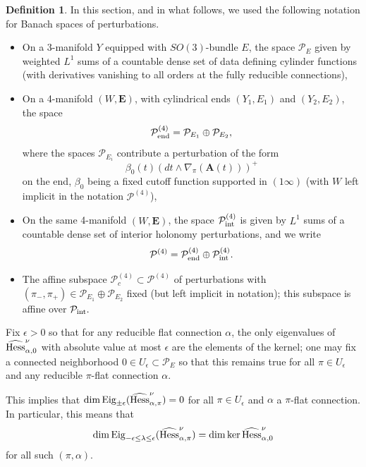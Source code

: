 \documentclass{memo-l}
\theoremstyle{definition}
\newtheorem{definition}[theorem]{Definition}
\theoremstyle{remark}
\numberwithin{section}{chapter}
\numberwithin{equation}{chapter}
\begin{document}
\begin{definition}\label{pertdef}In this section, and in what follows, we used the following notation for Banach spaces of perturbations. \begin{itemize}
\item On a 3-manifold $Y$ equipped with $SO(3)$-bundle $E$, the space $\mathcal P_E$ given by weighted $L^1$ sums of a countable dense set of data defining cylinder functions (with derivatives vanishing to all orders at the fully reducible connections), \\
\item On a 4-manifold $(W,\mathbf{E})$, with cylindrical ends $(Y_1, E_1)$ and $(Y_2, E_2)$, the space $$\mathcal P^{(4)}_{\textup{end}} = \mathcal P_{E_1} \oplus \mathcal P_{E_2},$$ where the spaces $\mathcal P_{E_i}$ contribute a perturbation of the form $$\beta_0(t) \left(dt \wedge \nabla_{\pi}(\mathbf{A}(t))\right)^+$$ on the end, $\beta_0$ being a fixed cutoff function supported in $(1 \infty)$ (with $W$ left implicit in the notation $\mathcal P^{(4)}$), \\
\item On the same 4-manifold $(W, \mathbf{E})$, the space $\mathcal P^{(4)}_{\textup{int}}$ is given by $L^1$ sums of a countable dense set of interior holonomy perturbations, and we write $$\mathcal P^{(4)} = \mathcal P^{(4)}_{\textup{end}} \oplus \mathcal P^{(4)}_{\textup{int}}.$$
\item The affine subspace $\mathcal P^{(4)}_c \subset \mathcal P^{(4)}$ of perturbations with $(\pi_-, \pi_+) \in \mathcal P_{E_1} \oplus \mathcal P_{E_2}$ fixed (but left implicit in notation); this subspace is affine over $\mathcal P_{\textup{int}}.$
\end{itemize}

Fix $\epsilon > 0$ so that for any reducible flat connection $\alpha$, the only eigenvalues of $\widehat{\textup{Hess}}^\nu_{\alpha,0}$ with absolute value at most $\epsilon$ are the elements of the kernel; one may fix a connected neighborhood $0 \in U_\epsilon \subset \mathcal P_E$ so that this remains true for all $\pi \in U_\epsilon$ and any reducible $\pi$-flat connection $\alpha$. 

This implies that $\dim \textup{Eig}_{\pm \epsilon}(\widehat{\textup{Hess}}^\nu_{\alpha,\pi}) = 0$ for all $\pi \in U_\epsilon$ and $\alpha$ a $\pi$-flat connection. In particular, this means that $$\dim \textup{Eig}_{-\epsilon \leq \lambda \leq \epsilon}(\widehat{\textup{Hess}}^\nu_{\alpha,\pi}) = \dim \ker \widehat{\textup{Hess}}^\nu_{\alpha,0}$$ for all such $(\pi, \alpha)$. 


\end{definition}
\end{document}
